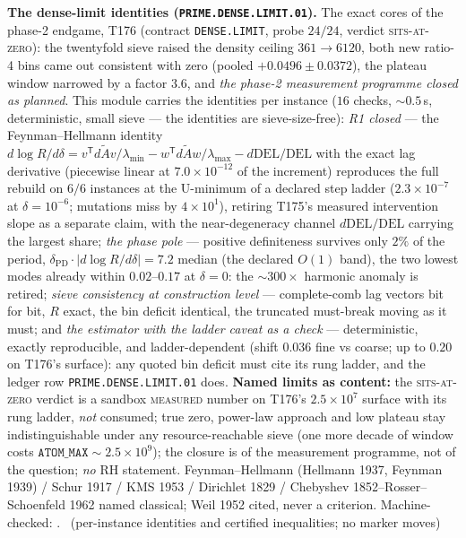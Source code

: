 \documentclass[11pt,a4paper]{article}
\theoremstyle{definition}
\begin{document}
\par\smallskip\noindent\textbf{The dense-limit identities
(\texttt{PRIME.DENSE.LIMIT.01}).}
The exact cores of the phase-2 endgame, T176 (contract
\texttt{DENSE.LIMIT}, probe $24/24$, verdict \textsc{sits-at-zero}):
the twentyfold sieve raised the density ceiling $361\to6120$, both new
ratio-4 bins came out consistent with zero (pooled $+0.0496\pm0.0372$),
the plateau window narrowed by a factor $3.6$, and \emph{the phase-2
measurement programme closed as planned}. This module carries the
identities per instance ($16$ checks, ${\sim}0.5$\,s, deterministic,
small sieve --- the identities are sieve-size-free): \emph{R1 closed}
--- the Feynman--Hellmann identity $d\log R/d\delta
=v^{\mathsf T}d\tilde Av/\lambda_{\min}
-w^{\mathsf T}d\tilde Aw/\lambda_{\max}-d\mathrm{DEL}/\mathrm{DEL}$
with the exact lag derivative (piecewise linear at $7.0\times10^{-12}$
of the increment) reproduces the full rebuild on $6/6$ instances at
the U-minimum of a declared step ladder ($2.3\times10^{-7}$ at
$\delta=10^{-6}$; mutations miss by $4\times10^{1}$), retiring T175's
measured intervention slope as a separate claim, with the
near-degeneracy channel $d\mathrm{DEL}/\mathrm{DEL}$ carrying the
largest share; \emph{the phase pole} --- positive definiteness
survives only $2\%$ of the period,
$\delta_{\mathrm{PD}}\cdot|d\log R/d\delta|=7.2$ median (the declared
$O(1)$ band), the two lowest modes already within $0.02$--$0.17$ at
$\delta=0$: the ${\sim}300\times$ harmonic anomaly is retired;
\emph{sieve consistency at construction level} --- complete-comb lag
vectors bit for bit, $R$ exact, the bin deficit identical, the
truncated must-break moving as it must; and \emph{the estimator with
the ladder caveat as a check} --- deterministic, exactly reproducible,
and ladder-dependent (shift $0.036$ fine vs coarse; up to $0.20$ on
T176's surface): any quoted bin deficit must cite its rung ladder, and
the ledger row \texttt{PRIME.DENSE.LIMIT.01} does.
\textbf{Named limits as content:} the \textsc{sits-at-zero} verdict is
a sandbox \textsc{measured} number on T176's $2.5\times10^{7}$ surface
with its rung ladder, \emph{not} consumed; true zero, power-law
approach and low plateau stay indistinguishable under any
resource-reachable sieve (one more decade of window costs
$\mathtt{ATOM\_MAX}\sim2.5\times10^{9}$); the closure is of the
measurement programme, not of the question; \emph{no} RH statement.
Feynman--Hellmann (Hellmann 1937, Feynman 1939) / Schur 1917 / KMS
1953 / Dirichlet 1829 / Chebyshev 1852--Rosser--Schoenfeld 1962 named
classical; Weil 1952 cited, never a criterion. Machine-checked:
.
\mE\ (per-instance identities and certified inequalities; no marker moves)
\par\smallskip
\end{document}
